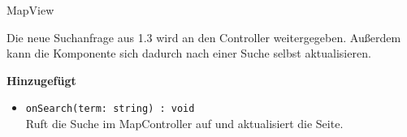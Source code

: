 \begin{Change}{MapView}
    
    Die neue Suchanfrage aus 1.3 wird an den Controller weitergegeben.
    Außerdem kann die Komponente sich dadurch nach einer Suche selbst aktualisieren.

    \textbf{Hinzugefügt}
    \begin{itemize}
        \item \texttt{onSearch(term: string) : void}
        \\ Ruft die Suche im MapController auf und aktualisiert die Seite.
    \end{itemize}

\end{Change}